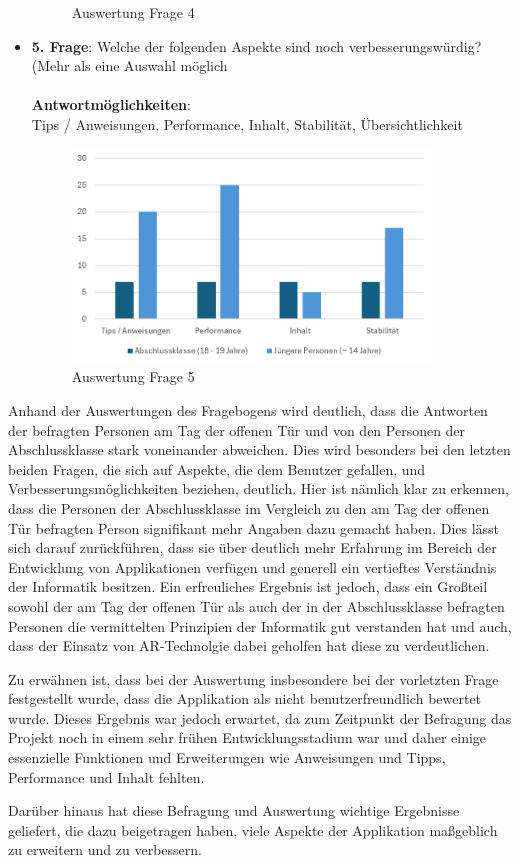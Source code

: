 \begin{itemize}
\begin{figure}[H]
        \caption{Auswertung Frage 4}
        \label{fig:fr1}
    \end{figure}
    \item \textbf{5. Frage}: Welche der folgenden Aspekte sind noch verbesserungswürdig? (Mehr als eine Auswahl möglich
    \\
    \\
    \textbf{Antwortmöglichkeiten}:\\
    Tips / Anweisungen, Performance, Inhalt, Stabilität, Übersichtlichkeit
    \\
    \begin{figure}[H]
        \centering
        \includegraphics[width=0.9\textwidth]{images/AuswertungFrage5}
        \caption{Auswertung Frage 5}
        \label{fig:fr1}
    \end{figure}
\end{itemize}

Anhand der Auswertungen des Fragebogens wird deutlich, dass die Antworten der befragten Personen am Tag der offenen Tür
und von den Personen der Abschlussklasse stark voneinander abweichen. Dies wird besonders bei den letzten beiden Fragen,
die sich auf Aspekte, die dem Benutzer gefallen, und Verbesserungsmöglichkeiten beziehen, deutlich. Hier ist nämlich klar
zu erkennen, dass die Personen der Abschlussklasse im Vergleich zu den am Tag der offenen Tür befragten Person signifikant
mehr Angaben dazu gemacht haben. Dies lässt sich darauf zurückführen, dass sie über deutlich mehr Erfahrung im Bereich
der Entwicklung von Applikationen verfügen und generell ein vertieftes Verständnis der Informatik besitzen. Ein erfreuliches
Ergebnis ist jedoch, dass ein Großteil sowohl der am Tag der offenen Tür als auch der in der Abschlussklasse
befragten Personen die vermittelten Prinzipien der Informatik gut verstanden hat und auch, dass der Einsatz von AR-Technolgie
dabei geholfen hat diese zu verdeutlichen.

Zu erwähnen ist, dass bei der Auswertung insbesondere bei der vorletzten Frage festgestellt wurde, dass die Applikation
als nicht benutzerfreundlich bewertet wurde. Dieses Ergebnis war jedoch erwartet, da zum Zeitpunkt der Befragung das
Projekt noch in einem sehr frühen Entwicklungsstadium war und daher einige essenzielle Funktionen und Erweiterungen wie
Anweisungen und Tipps, Performance und Inhalt fehlten.

Darüber hinaus hat diese Befragung und Auswertung wichtige Ergebnisse geliefert, die dazu beigetragen haben, viele Aspekte
der Applikation maßgeblich zu erweitern und zu verbessern.